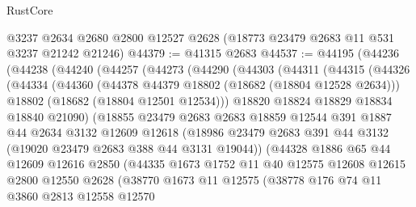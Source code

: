 \begin{lexlean}{RustCore}
\begin{coremodule}
    @3237
    @2634
    @2680
    @2800
    @12527
    @2628
    (@18773 @23479 @2683 @11 @531 @3237 @21242 @21246)
@44379 := @41315 @2683
@44537 := @44195
    (@44236
      (@44238
        (@44240
          (@44257
            (@44273
              (@44290
                (@44303
                  (@44311
                    (@44315
                      (@44326
                        (@44334
                          (@44360
                            (@44378 @44379 @18802 (@18682 (@18804 @12528 @2634)))
                            @18802
                            (@18682 (@18804 @12501 @12534)))
                          @18820
                          @18824
                          @18829
                          @18834
                          @18840
                          @21090)
                        (@18855
                          @23479
                          @2683
                          @2683
                          @18859
                          @12544
                          @391
                          @1887
                          @44
                          @2634
                          @3132
                          @12609
                          @12618
                          (@18986
                            @23479
                            @2683
                            @391
                            @44
                            @3132
                            (@19020 @23479 @2683 @388 @44 @3131 @19044))
                          (@44328
                            @1886
                            @65
                            @44
                            @12609
                            @12616
                            @2850
                            (@44335
                              @1673
                              @1752
                              @11
                              @40
                              @12575
                              @12608
                              @12615
                              @2800
                              @12550
                              @2628
                              (@38770
                                @1673
                                @11
                                @12575
                                (@38778
                                  @176
                                  @74
                                  @11
                                  @3860
                                  @2813
                                  @12558
                                  @12570

\end{coremodule}
\end{lexlean}
